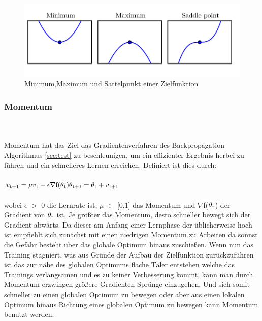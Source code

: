 \documentclass{llncs}
\begin{document}
\begin{figure}[htbp] 
	\centering
	\includegraphics[width=1.0\textwidth]{saddle.png}
	\caption{Minimum,Maximum und Sattelpunkt einer Zielfunktion \protect\cite{saddleimage}}
	\label{fig:Bild5}
\end{figure}


\subsubsection{Momentum}\label{sec:momentum}
~\\\\
Momentum hat das Ziel das Gradientenverfahren des Backpropagation Algorithmus \ref{sec:test} zu beschleunigen, um ein effizienter Ergebnis herbei zu führen und ein schnelleres Lernen erreichen. Definiert ist dies durch:
\\\\
\begin{math}
v\textsubscript{t+1} =\mu v\textsubscript{t}-\epsilon\nabla$f$(\theta\textsubscript{t})
\theta\textsubscript{t+1}= \theta\textsubscript{t}+v\textsubscript{t+1}
\end{math}
\\\\
wobei $\epsilon$ $>$ 0 die Lernrate ist,  $\mu$ $\in$ [0,1] das Momentum und $\nabla$f($\theta\textsubscript{t}$) der Gradient von $\theta\textsubscript{t}$ ist. Je größter das Momentum, desto schneller bewegt sich der Gradient abwärts. Da dieser am Anfang einer Lernphase der üblicherweise hoch ist empfiehlt sich zunächst mit einen niedrigen Momentum zu Arbeiten da sonnst die Gefahr besteht über das globale Optimum hinaus zuschießen. Wenn nun das Training stagniert, was aus Gründe der Aufbau der Zielfunktion zurückzuführen ist das zur nähe des globalen Optimums flache Täler entstehen welche das Trainings verlangsamen und es zu keiner Verbesserung kommt, kann man durch Momentum erzwingen größere Gradienten Sprünge einzugehen. Und sich somit schneller zu einen globalen Optimum zu bewegen oder aber aus einen lokalen Optimum hinaus Richtung eines globalen Optimum zu bewegen kann Momentum benutzt werden\cite{momentum}.
\end{document}
